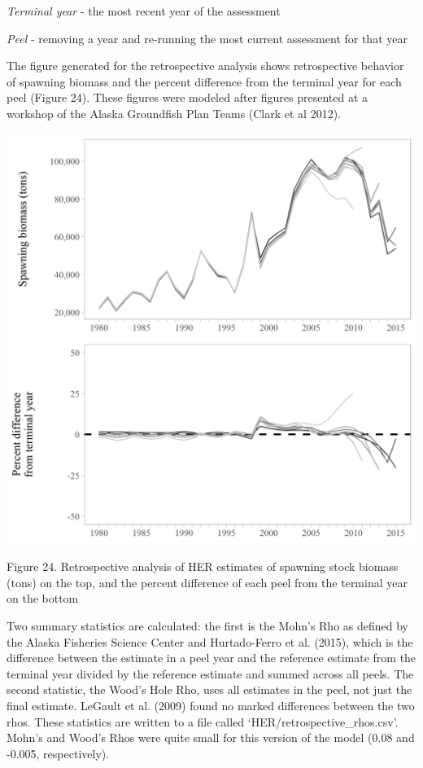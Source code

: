 \documentclass[]{article}
\begin{document}
\emph{Terminal year} - the most recent year of the assessment

\emph{Peel} - removing a year and re-running the most current assessment
for that year

The figure generated for the retrospective analysis shows retrospective
behavior of spawning biomass and the percent difference from the
terminal year for each peel (Figure 24). These figures were modeled
after figures presented at a workshop of the Alaska Groundfish Plan
Teams (Clark et al 2012).

\includegraphics[width=1\linewidth]{../../HER/figs/HER/retrospective}

Figure 24. Retrospective analysis of HER estimates of spawning stock
biomass (tons) on the top, and the percent difference of each peel from
the terminal year on the bottom

Two summary statistics are calculated: the first is the Mohn's Rho as
defined by the Alaska Fisheries Science Center and Hurtado-Ferro et al.
(2015), which is the difference between the estimate in a peel year and
the reference estimate from the terminal year divided by the reference
estimate and summed across all peels. The second statistic, the Wood's
Hole Rho, uses all estimates in the peel, not just the final estimate.
LeGault et al. (2009) found no marked differences between the two rhos.
These statistics are written to a file called
`HER/retrospective\_rhos.csv'. Mohn's and Wood's Rhos were quite small
for this version of the model (0.08 and -0.005, respectively).
\end{document}
